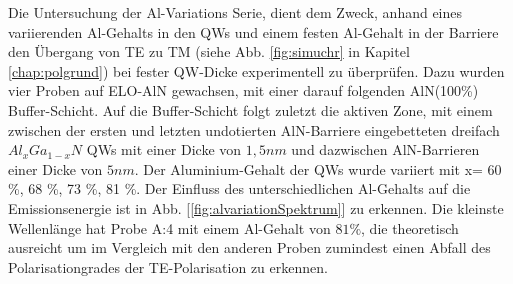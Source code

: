 Die Untersuchung der Al-Variations Serie, dient dem Zweck, anhand eines variierenden Al-Gehalts in den QWs und einem festen Al-Gehalt in der Barriere den \"Ubergang von TE zu TM (siehe Abb. \ref{fig:simuchr} in Kapitel \ref{chap:polgrund}) bei fester QW-Dicke experimentell zu \"uberpr\"ufen. Dazu wurden vier Proben auf ELO-AlN gewachsen, mit einer darauf folgenden AlN(100\%) Buffer-Schicht. Auf die Buffer-Schicht folgt zuletzt die aktiven Zone, mit einem zwischen der ersten und letzten undotierten AlN-Barriere eingebetteten dreifach $Al_{x}Ga_{1-x}N$ QWs mit einer Dicke von $1,5nm$ und dazwischen AlN-Barrieren einer Dicke von $5nm$. Der Aluminium-Gehalt der QWs wurde variiert mit x= 60 \%, 68 \%, 73 \%, 81 \%. 
Der Einfluss des unterschiedlichen Al-Gehalts auf die Emissionsenergie ist in Abb. [\ref{fig:alvariationSpektrum}] zu erkennen. Die kleinste Wellenl\"ange hat Probe A:4 mit einem Al-Gehalt von $81\%$, die theoretisch ausreicht um im Vergleich mit den anderen Proben zumindest einen Abfall des Polarisationgrades der TE-Polarisation zu erkennen.
%
